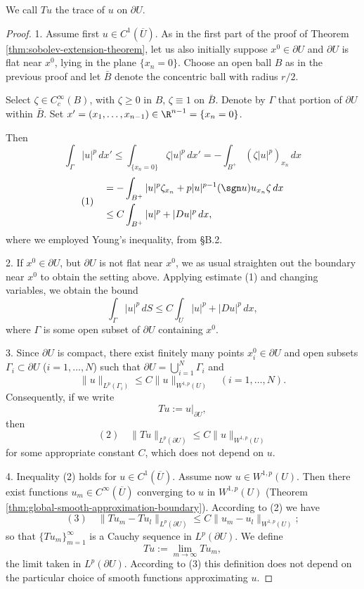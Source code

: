 \begin{definition}
\label{def:trace-operator}
We call $Tu$ the trace of $u$ on $\partial U$.
\end{definition}

\begin{proof}
1. Assume first $u \in C^1(\overline{U})$. As in the first part of the proof of Theorem \ref{thm:sobolev-extension-theorem}, let us also initially suppose $x^0 \in \partial U$ and $\partial U$ is flat near $x^0$, lying in the plane $\{x_n = 0\}$. Choose an open ball $B$ as in the previous proof and let $\bar{B}$ denote the concentric ball with radius $r/2$.

Select $\zeta \in C_c^\infty(B)$, with $\zeta \ge 0$ in $B$, $\zeta \equiv 1$ on $\bar{B}$. Denote by $\Gamma$ that portion of $\partial U$ within $\bar{B}$. Set $x' = (x_1, \ldots, x_{n-1}) \in \R^{n-1} = \{x_n = 0\}$.

Then
$$\int_\Gamma |u|^p\,dx' \le \int_{\{x_n=0\}} \zeta|u|^p\,dx' = -\int_{B^+} (\zeta|u|^p)_{x_n}\,dx$$
$$(1) \quad \begin{split}
& = -\int_{B^+} |u|^p\zeta_{x_n} + p|u|^{p-1}(\sgn u)u_{x_n}\zeta \, dx\\
& \le C\int_{B^+} |u|^p + |Du|^p \, dx,
\end{split}$$
where we employed Young's inequality, from §B.2.

2. If $x^0 \in \partial U$, but $\partial U$ is not flat near $x^0$, we as usual straighten out the boundary near $x^0$ to obtain the setting above. Applying estimate (1) and changing variables, we obtain the bound
$$\int_\Gamma |u|^p\,dS \le C\int_U |u|^p + |Du|^p \, dx,$$
where $\Gamma$ is some open subset of $\partial U$ containing $x^0$.

3. Since $\partial U$ is compact, there exist finitely many points $x_i^0 \in \partial U$ and open subsets $\Gamma_i \subset \partial U$ ($i = 1, \ldots, N$) such that $\partial U = \bigcup_{i=1}^N \Gamma_i$ and
$$\|u\|_{L^p(\Gamma_i)} \le C\|u\|_{W^{1,p}(U)} \quad (i = 1, \ldots, N).$$
Consequently, if we write
$$Tu := u|_{\partial U},$$
then
$$(2) \quad \|Tu\|_{L^p(\partial U)} \le C\|u\|_{W^{1,p}(U)}$$
for some appropriate constant $C$, which does not depend on $u$.

4. Inequality (2) holds for $u \in C^1(\overline{U})$. Assume now $u \in W^{1,p}(U)$. Then there exist functions $u_m \in C^\infty(\overline{U})$ converging to $u$ in $W^{1,p}(U)$ (Theorem \ref{thm:global-smooth-approximation-boundary}). According to (2) we have
$$(3) \quad \|Tu_m - Tu_l\|_{L^p(\partial U)} \le C\|u_m - u_l\|_{W^{1,p}(U)};$$
so that $\{Tu_m\}_{m=1}^\infty$ is a Cauchy sequence in $L^p(\partial U)$. We define
$$Tu := \lim_{m \to \infty} Tu_m,$$
the limit taken in $L^p(\partial U)$. According to (3) this definition does not depend on the particular choice of smooth functions approximating $u$.


\end{proof}
